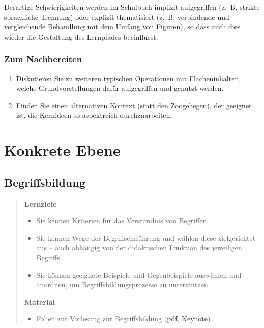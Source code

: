 \documentclass[
  ngerman,
]{scrbook}
\providecommand{\tightlist}{%
  \setlength{\itemsep}{0pt}\setlength{\parskip}{0pt}}
\theoremstyle{definition}
\theoremstyle{definition}
\theoremstyle{definition}
\theoremstyle{definition}
\theoremstyle{remark}
\begin{document}
Derartige Schwierigkeiten werden im Schulbuch implizit aufgegriffen (z.~B. strikte sprachliche Trennung) oder explizit thematisiert (z.~B. verbindende und vergleichende Behandlung mit dem Umfang von Figuren), so dass auch dies wieder die Gestaltung des Lernpfades beeinflusst.

\hypertarget{erstesintermezzo-nachbereitung}{%
\section{Zum Nachbereiten}\label{erstesintermezzo-nachbereitung}}

\begin{enumerate}
\def\labelenumi{\arabic{enumi}.}
\tightlist
\item
  Diskutieren Sie zu weiteren typischen Operationen mit Flächeninhalten, welche Grundvorstellungen dafür aufgegriffen und genutzt werden.
\item
  Finden Sie einen alternativen Kontext (statt den Zoogehegen), der geeignet ist, die Kernideen so aspektreich durchzuarbeiten.
\end{enumerate}

\hypertarget{part-konkrete-ebene}{%
\part*{Konkrete Ebene}\label{part-konkrete-ebene}}

\hypertarget{begriffsbildung}{%
\chapter{Begriffsbildung}\label{begriffsbildung}}

\begin{quote}
\textbf{Lernziele}

\begin{itemize}
\tightlist
\item
  Sie kennen Kriterien für das Verständnis von Begriffen.
\item
  Sie kennen Wege der Begriffseinführung und wählen diese zielgerichtet aus -- auch abhängig von der didaktischen Funktion des jeweiligen Begriffs.
\item
  Sie können geeignete Beispiele und Gegenbeispiele auswählen und anordnen, um Begriffsbildungsprozesse zu unterstützen.
\end{itemize}

\textbf{Material}

\begin{itemize}
\tightlist
\item
  Folien zur Vorlesung zur Begriffsbildung (\href{files/Stoffdidaktik-WiSe2122-Kap6.pdf}{pdf}, \href{files/Stoffdidaktik-WiSe2122-Kap6.key}{Keynote})
\end{itemize}
\end{quote}
\end{document}
